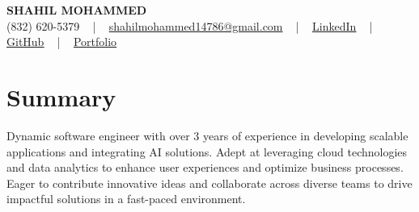 \documentclass[letterpaper,10pt]{article}
\begin{document}
\begin{center}
    {\fontsize{14pt}{12pt}\selectfont \textbf{\MakeUppercase{Shahil Mohammed}}}\\ \vspace{2pt}
    \fontsize{10pt}{12pt}\selectfont (832) 620-5379 ~ | ~ \href{mailto:shahilmohammed14786@gmail.com}{shahilmohammed14786@gmail.com} ~ | ~  
    \href{https://www.linkedin.com/in/shahil-mohammed-9652931a1/}{\color{blue}\underline{LinkedIn}}  ~ | ~ 
    \href{https://github.com/freakbeast14}{\color{blue}\underline{GitHub}} ~ | ~ 
    \href{https://shahil-mohammed.netlify.app/}{\color{blue}\underline{Portfolio}}
    \vspace{-8pt}
\end{center}

\section{Summary}
\vspace{-2pt}\fontsize{8pt}{9pt}\selectfont
Dynamic software engineer with over 3 years of experience in developing scalable applications and integrating AI solutions. Adept at leveraging cloud technologies and data analytics to enhance user experiences and optimize business processes. Eager to contribute innovative ideas and collaborate across diverse teams to drive impactful solutions in a fast-paced environment.
 \vspace{-5pt}
 
\vspace{-2pt}
\end{document}
